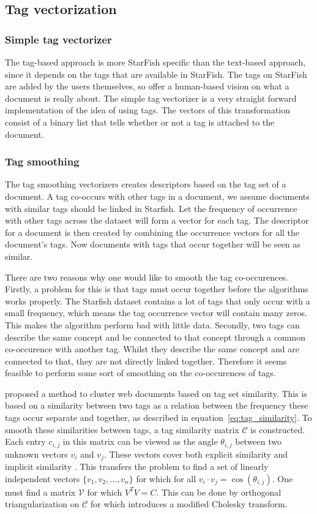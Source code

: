 \subsection{Tag vectorization}
\subsubsection{Simple tag vectorizer}
The tag-based approach is more StarFish specific than the text-based approach, since it depends on the tags that are available in StarFish. The tags on StarFish are added by the users themselves, so offer a human-based vision on what a document is really about. The simple tag vectorizer is a very straight forward implementation of the idea of using tags. The vectors of this transformation consist of a binary list that tells whether or not a tag is attached to the document. 

\subsubsection{Tag smoothing}
The tag smoothing vectorizers creates descriptors based on the tag set of a document. A tag co-occurs with other tags in a document, we assume documents with similar tags should be linked in Starfish. Let the frequency of occurrence with other tags across the dataset will form a vector for each tag. The descriptor for a document is then created by combining the occurrence vectors for all the document's tags. Now documents with tags that occur together will be seen as similar.

There are two reasons why one would like to smooth the tag co-occurences. Firstly, a problem for this is that tags must occur together before the algorithms works properly. The Starfish dataset contains a lot of tags that only occur with a small frequency, which means the tag occurrence vector will contain many zeros. This makes the algorithm perform bad with little data. Secondly, two tags can describe the same concept and be connected to that concept through a common co-occurence with another tag. Whilst they describe the same concept and are connected to that, they are not directly linked together. Therefore it seems feasible to perform some sort of smoothing on the co-occurences of tags.

\citet{zhou2011web} proposed a method to cluster web documents based on tag set similarity. This is based on a similarity between two tags as a relation between the frequency these tags occur separate and together, as described in equation~\ref{eq:tag_similarity}. To smooth these similarities between tags, a tag similarity matrix $\mathcal{C}$ is constructed. Each entry $c_{i,j}$ in this matrix can be viewed as the angle $\theta_{i,j}$ between two unknown vectors $v_i$ and $v_j$. These vectors cover both explicit similarity and implicit similarity \citep{park2010vector}. This transfers the problem to find a set of linearly independent vectors $\{v_1,v_2,\ldots,v_n\}$ for which for all $v_i \cdot v_j = \cos(\theta_{i,j})$. One must find a matrix $\mathcal{V}$ for which $V^TV = C$. This can be done by orthogonal triangularization on $\mathcal{C}$ for which \citeauthor{zhou2011web} introduces a modified Cholesky transform.


